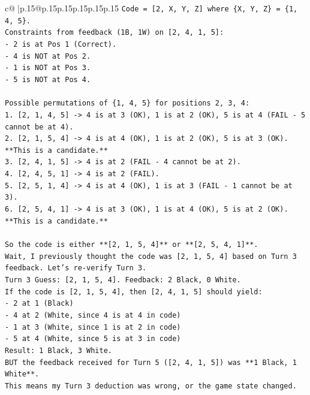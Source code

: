 \documentclass{article}
\begin{document}
{\begin{supertabular}{c@{$\;$}|p{.15\linewidth}@{}p{.15\linewidth}p{.15\linewidth}p{.15\linewidth}p{.15\linewidth}p{.15\linewidth}}
{{{\texttt{Code = {[}2, X, Y, Z{]} where \{X, Y, Z\} = \{1, 4, 5\}.} \\
\texttt{Constraints from feedback (1B, 1W) on {[}2, 4, 1, 5{]}:} \\
\texttt{{-} 2 is at Pos 1 (Correct).} \\
\texttt{{-} 4 is NOT at Pos 2.} \\
\texttt{{-} 1 is NOT at Pos 3.} \\
\texttt{{-} 5 is NOT at Pos 4.} \\
\\ 
\texttt{Possible permutations of \{1, 4, 5\} for positions 2, 3, 4:} \\
\texttt{1. {[}2, 1, 4, 5{]} {-}> 4 is at 3 (OK), 1 is at 2 (OK), 5 is at 4 (FAIL {-} 5 cannot be at 4).} \\
\texttt{2. {[}2, 1, 5, 4{]} {-}> 4 is at 4 (OK), 1 is at 2 (OK), 5 is at 3 (OK). **This is a candidate.**} \\
\texttt{3. {[}2, 4, 1, 5{]} {-}> 4 is at 2 (FAIL {-} 4 cannot be at 2).} \\
\texttt{4. {[}2, 4, 5, 1{]} {-}> 4 is at 2 (FAIL).} \\
\texttt{5. {[}2, 5, 1, 4{]} {-}> 4 is at 4 (OK), 1 is at 3 (FAIL {-} 1 cannot be at 3).} \\
\texttt{6. {[}2, 5, 4, 1{]} {-}> 4 is at 3 (OK), 1 is at 4 (OK), 5 is at 2 (OK). **This is a candidate.**} \\
\\ 
\texttt{So the code is either **{[}2, 1, 5, 4{]}** or **{[}2, 5, 4, 1{]}**.} \\
\texttt{Wait, I previously thought the code was {[}2, 1, 5, 4{]} based on Turn 3 feedback. Let's re{-}verify Turn 3.} \\
\texttt{Turn 3 Guess: {[}2, 1, 5, 4{]}. Feedback: 2 Black, 0 White.} \\
\texttt{If the code is {[}2, 1, 5, 4{]}, then {[}2, 4, 1, 5{]} should yield:} \\
\texttt{{-} 2 at 1 (Black)} \\
\texttt{{-} 4 at 2 (White, since 4 is at 4 in code)} \\
\texttt{{-} 1 at 3 (White, since 1 is at 2 in code)} \\
\texttt{{-} 5 at 4 (White, since 5 is at 3 in code)} \\
\texttt{Result: 1 Black, 3 White.} \\
\texttt{BUT the feedback received for Turn 5 ({[}2, 4, 1, 5{]}) was **1 Black, 1 White**.} \\
\texttt{This means my Turn 3 deduction was wrong, or the game state changed.} \\
}}}
\end{supertabular}}
\end{document}
